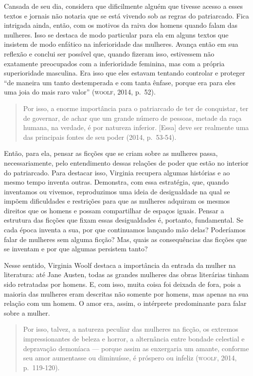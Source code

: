 Cansada de seu dia, considera que dificilmente alguém que tivesse acesso
a esses textos e jornais não notaria que se está vivendo sob as regras
do patriarcado. Fica intrigada ainda, então, com os motivos da raiva dos
homens quando falam das mulheres. Isso se destaca de modo particular
para ela em alguns textos que insistem de modo enfático na inferioridade
das mulheres. Avança então em sua reflexão e conclui ser possível que,
quando fizeram isso, estivessem não exatamente preocupados com a
inferioridade feminina, mas com a própria superioridade masculina. Era
isso que eles estavam tentando controlar e proteger ``de maneira um
tanto destemperada e com tanta ênfase, porque era para eles uma joia do
mais raro valor'' (\textsc{woolf}, 2014, p.~52).

\begin{quote}
Por isso, a enorme importância para o patriarcado de ter de
conquistar, ter de governar, de achar que um grande número de pessoas,
metade da raça humana, na verdade, é por natureza inferior. {[}Essa{]}
deve ser realmente uma das principais fontes de seu poder (2014, p.~53-54).
\end{quote}

Então, para ela, pensar as ficções que se criam sobre as mulheres passa,
necessariamente, pelo entendimento dessas relações de poder que estão no
interior do patriarcado. Para destacar isso, Virginia recupera algumas
histórias e ao mesmo tempo inventa outras. Demonstra, com essa
estratégia, que, quando inventamos ou vivemos, reproduzimos uma ideia de
desigualdade na qual se impõem dificuldades e restrições para que as
mulheres adquiram os mesmos direitos que os homens e possam compartilhar
de espaços iguais. Pensar a estrutura das ficções que fixam essas
desigualdades é, portanto, fundamental. Se cada época inventa a sua, por
que continuamos lançando mão delas? Poderíamos falar de mulheres sem
alguma ficção? Mas, quais as consequências das ficções que se inventam e
por que algumas persistem tanto?

Nesse sentido, Virginia Woolf destaca a importância da entrada da mulher
na literatura: até Jane Austen, todas as grandes mulheres das obras
literárias tinham sido retratadas por homens. E, com isso, muita coisa
foi deixada de fora, pois a maioria das mulheres eram descritas não
somente por homens, mas apenas na sua relação com um homem. O amor era,
assim, o intérprete predominante para falar sobre a mulher.

\begin{quote}
Por isso, talvez, a natureza peculiar das mulheres na ficção, os
extremos impressionantes de beleza e horror, a alternância entre bondade
celestial e depravação demoníaca --- porque assim as enxergaria um
amante, conforme seu amor aumentasse ou diminuísse, é próspero ou
infeliz (\textsc{woolf}, 2014, p.~119-120).
\end{quote}

